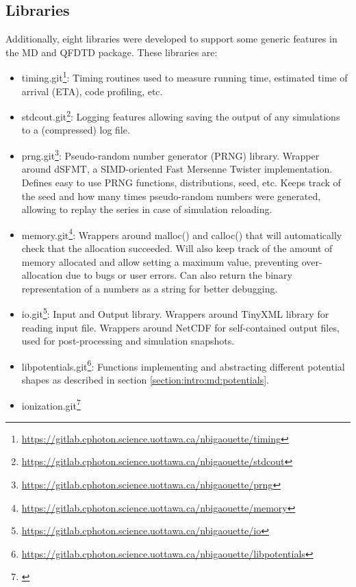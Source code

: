 \subsection{Libraries}

Additionally, eight libraries were developed to support some generic features
in the MD and QFDTD package. These libraries are:
\begin{itemize}
\item timing.git\footnote{ \url{
    https://gitlab.cphoton.science.uottawa.ca/nbigaouette/timing}}:
    Timing routines used to measure running time, estimated time of arrival
    (ETA), code profiling, etc.
\item stdcout.git\footnote{ \url{
    https://gitlab.cphoton.science.uottawa.ca/nbigaouette/stdcout}}:
    Logging features allowing saving the output of any simulations to a
    (compressed) log file.
\item prng.git\footnote{ \url{
    https://gitlab.cphoton.science.uottawa.ca/nbigaouette/prng}}:
    Pseudo-random number generator (PRNG) library. Wrapper around
    dSFMT\cite{prng2009}, a SIMD-oriented Fast Mersenne Twister implementation.
    Defines easy to use PRNG functions, distributions, seed, etc. Keeps track of
    the seed and how many times pseudo-random numbers were generated, allowing
    to replay the series in case of simulation reloading.
\item memory.git\footnote{ \url{
    https://gitlab.cphoton.science.uottawa.ca/nbigaouette/memory}}:
    Wrappers around malloc() and calloc() that will automatically check that
    the allocation succeeded. Will also keep track of the amount of
    memory allocated and allow setting a maximum value, preventing
    over-allocation due to bugs or user errors. Can also return the binary
    representation of a numbers as a string for better debugging.
\item io.git\footnote{ \url{
    https://gitlab.cphoton.science.uottawa.ca/nbigaouette/io}}:
    Input and Output library. Wrappers around TinyXML library\cite{tinyxml} for
    reading input file. Wrappers around NetCDF\cite{netcdf} for self-contained
    output files, used for post-processing and simulation snapshots.
\item libpotentials.git\footnote{ \url{
    https://gitlab.cphoton.science.uottawa.ca/nbigaouette/libpotentials}}:
    Functions implementing and abstracting different potential shapes as
    described in section \ref{section:intro:md:potentials}.
\item ionization.git\footnote{ \url{
}}
\end{itemize}
